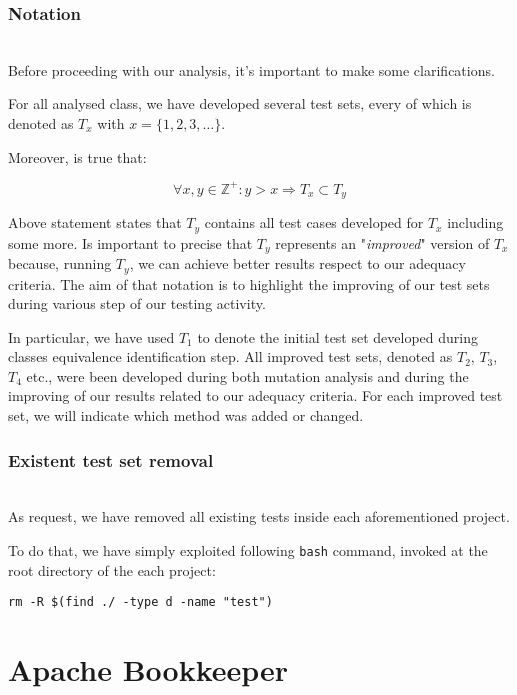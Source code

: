 \documentclass[sigconf]{acmart}
\begin{document}
\subsubsection{Notation}
\hfill\\
Before proceeding with our analysis, it's important to make some clarifications.

For all analysed class, we have developed several test sets, every of which is denoted as $T_x$ with $x = \{1,2,3,\ldots\}$.  

Moreover, is true that:

\begin{equation}
\forall x,y \in \mathbb{Z^+} : y > x  \Rightarrow T_x \subset T_y
\end{equation}

Above statement states that $T_y$ contains all test cases developed for $T_x$ including some more. Is important to precise that $T_y$ represents an "\textit{improved}" version of $T_x$ because, running $T_y$, we can achieve better results respect to our adequacy criteria. The aim of that notation is to highlight the improving of our test sets during various step of our testing activity.

In particular, we have used $T_1$ to denote the initial test set developed during classes equivalence identification step. All improved test sets, denoted as $T_2$, $T_3$, $T_4$ etc., were been developed during both mutation analysis and during the improving of our results related to our adequacy criteria. For each improved test set, we will indicate which method was added or changed.

\subsubsection{Existent test set removal}
\hfill\\
As request, we have removed all existing tests inside each aforementioned project. 

To do that, we have simply exploited following \texttt{bash} command, invoked at the root directory of the each project:

\begin{lstlisting}
rm -R $(find ./ -type d -name "test") 
\end{lstlisting}

\section{Apache Bookkeeper\texttrademark}
\end{document}
